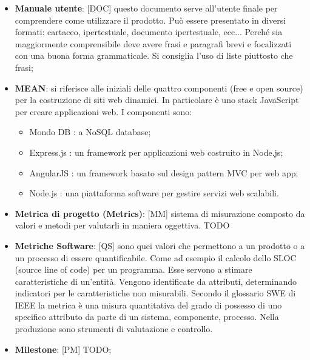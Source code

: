 \begin{itemize}


	\item \textbf{Manuale utente}: [DOC] questo documento serve all'utente finale per comprendere come utilizzare il prodotto. Può essere presentato in diversi formati: cartaceo, ipertestuale, documento ipertestuale, ecc... \newline
	Perché sia maggiormente comprensibile deve avere frasi e paragrafi brevi e focalizzati con una buona forma grammaticale. Si consiglia l'uso di liste piuttosto che frasi;


	\item \textbf{MEAN}: si riferisce alle iniziali delle quattro componenti (free e open source) per la costruzione di siti web dinamici. \newline
In particolare è uno stack JavaScript per creare applicazioni web. \newline
I componenti sono:
	\begin{itemize}
		\item Mondo DB : a NoSQL database;
		\item Express.js : un framework per applicazioni web costruito in Node.js;
		\item AngularJS : un framework basato sul design pattern MVC per web app;
		\item Node.js : una piattaforma software per gestire servizi web scalabili.
	\end{itemize}

	\item \textbf{Metrica di progetto (Metrics)}: [MM] sistema di misurazione composto da valori e metodi per valutarli in maniera oggettiva. TODO

	\item \textbf{Metriche Software}: [QS] sono quei valori che permettono a un prodotto o a un processo di essere quantificabile. Come ad esempio il calcolo dello SLOC (source line of code) per un programma. Esse servono a stimare caratteristiche di un'entità. Vengono identificate da attributi, determinando indicatori per le caratteristiche non misurabili. Secondo il glossario SWE di IEEE la metrica è una misura quantitativa del grado di possesso di uno specifico attributo da parte di un sistema, componente, processo. \newline
	Nella produzione sono strumenti di valutazione e controllo.



	\item \textbf{Milestone}: [PM] TODO;


\end{itemize}
